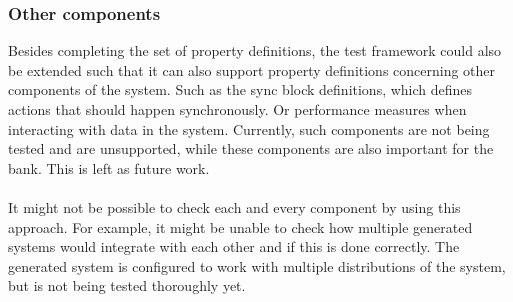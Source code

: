 \subsubsection{Other components}
Besides completing the set of property definitions, the test framework could also be extended such that it
can also support property definitions concerning other components of the system. Such as the sync block
definitions, which defines actions that should happen synchronously. Or performance
measures when interacting with data in the system. Currently, such components
are not being tested and are unsupported, while these
components are also important for the bank. This is left as future work.\\
\\
It might not be possible to check each and every component
by using this approach. For example, it might be unable to check how
multiple generated systems would integrate with each other and if this is done
correctly. The generated system is configured to work with multiple
distributions of the system, but is not being tested thoroughly yet.

